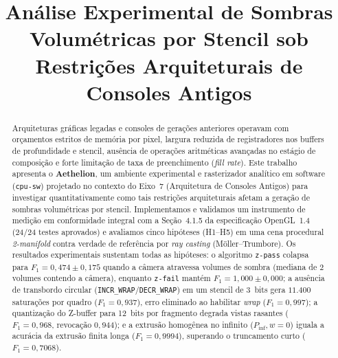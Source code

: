 \documentclass[conference]{IEEEtran}
\begin{document}
\title{Análise Experimental de Sombras Volumétricas por Stencil sob Restrições Arquiteturais de Consoles Antigos}

\author{
\and
{}
}

\maketitle

\begin{abstract}
Arquiteturas gráficas legadas e consoles de gerações anteriores operavam com orçamentos estritos de memória por pixel, largura reduzida de registradores nos buffers de profundidade e stencil, ausência de operações aritméticas avançadas no estágio de composição e forte limitação de taxa de preenchimento (\textit{fill rate}). Este trabalho apresenta o \textbf{Aethelion}, um ambiente experimental e rasterizador analítico em software (\texttt{cpu-sw}) projetado no contexto do Eixo~7 (Arquitetura de Consoles Antigos) para investigar quantitativamente como tais restrições arquiteturais afetam a geração de sombras volumétricas por stencil. Implementamos e validamos um instrumento de medição em conformidade integral com a Seção~4.1.5 da especificação OpenGL~1.4 (24/24 testes aprovados) e avaliamos cinco hipóteses (H1--H5) em uma cena procedural \textit{2-manifold} contra verdade de referência por \textit{ray casting} (Möller--Trumbore). Os resultados experimentais sustentam todas as hipóteses: o algoritmo \texttt{z-pass} colapsa para $F_1 = 0{,}474 \pm 0{,}175$ quando a câmera atravessa volumes de sombra (mediana de $2$ volumes contendo a câmera), enquanto \texttt{z-fail} mantém $F_1 = 1{,}000 \pm 0{,}000$; a ausência de transbordo circular (\texttt{INCR\_WRAP}/\texttt{DECR\_WRAP}) em um stencil de 3~bits gera $11.400$ saturações por quadro ($F_1 = 0{,}937$), erro eliminado ao habilitar \textit{wrap} ($F_1 = 0{,}997$); a quantização do Z-buffer para 12~bits por fragmento degrada vistas rasantes ($F_1 = 0{,}968$, revocação $0{,}944$); e a extrusão homogênea no infinito ($P_{\text{inf}}, w=0$) iguala a acurácia da extrusão finita longa ($F_1 = 0{,}9994$), superando o truncamento curto ($F_1 = 0{,}7068$).
\end{abstract}
\end{document}
